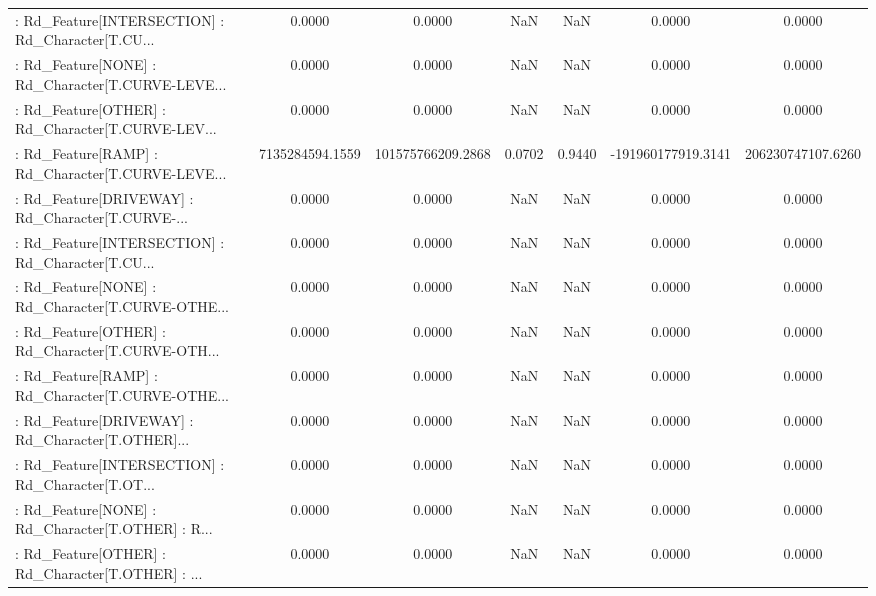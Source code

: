 \begin{longtable}{p{4cm}cccccc}
 : Rd\_Feature[INTERSECTION] : Rd\_Character[T.CU... &            0.0000 &            0.0000 &     NaN &          NaN &             0.0000 &            0.0000 \\
 : Rd\_Feature[NONE] : Rd\_Character[T.CURVE-LEVE... &            0.0000 &            0.0000 &     NaN &          NaN &             0.0000 &            0.0000 \\
 : Rd\_Feature[OTHER] : Rd\_Character[T.CURVE-LEV... &            0.0000 &            0.0000 &     NaN &          NaN &             0.0000 &            0.0000 \\
 : Rd\_Feature[RAMP] : Rd\_Character[T.CURVE-LEVE... &   7135284594.1559 & 101575766209.2868 &  0.0702 &       0.9440 & -191960177919.3141 & 206230747107.6260 \\
 : Rd\_Feature[DRIVEWAY] : Rd\_Character[T.CURVE-... &            0.0000 &            0.0000 &     NaN &          NaN &             0.0000 &            0.0000 \\
 : Rd\_Feature[INTERSECTION] : Rd\_Character[T.CU... &            0.0000 &            0.0000 &     NaN &          NaN &             0.0000 &            0.0000 \\
 : Rd\_Feature[NONE] : Rd\_Character[T.CURVE-OTHE... &            0.0000 &            0.0000 &     NaN &          NaN &             0.0000 &            0.0000 \\
 : Rd\_Feature[OTHER] : Rd\_Character[T.CURVE-OTH... &            0.0000 &            0.0000 &     NaN &          NaN &             0.0000 &            0.0000 \\
 : Rd\_Feature[RAMP] : Rd\_Character[T.CURVE-OTHE... &            0.0000 &            0.0000 &     NaN &          NaN &             0.0000 &            0.0000 \\
 : Rd\_Feature[DRIVEWAY] : Rd\_Character[T.OTHER]... &            0.0000 &            0.0000 &     NaN &          NaN &             0.0000 &            0.0000 \\
 : Rd\_Feature[INTERSECTION] : Rd\_Character[T.OT... &            0.0000 &            0.0000 &     NaN &          NaN &             0.0000 &            0.0000 \\
 : Rd\_Feature[NONE] : Rd\_Character[T.OTHER] : R... &            0.0000 &            0.0000 &     NaN &          NaN &             0.0000 &            0.0000 \\
 : Rd\_Feature[OTHER] : Rd\_Character[T.OTHER] : ... &            0.0000 &            0.0000 &     NaN &          NaN &             0.0000 &            0.0000 \\

\end{longtable}
